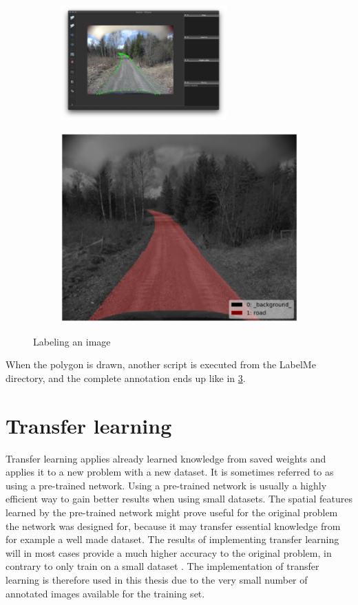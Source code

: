 \documentclass[USenglish]{ifimaster}  %
\begin{document}
\begin{figure}[ht]
\centering
\begin{subfigure}{.6\textwidth}
\includegraphics[width=0.7\textwidth]{bilder/annotating.png}
\label{fig:annotate}
\end{subfigure}
\begin{subfigure}{.6\textwidth}
\includegraphics[width=.7\linewidth]{bilder/label_viz.png}
\label{fig:finished_annotation}
\end{subfigure}
\caption{Labeling an image}
\end{figure}

When the polygon is drawn, another script is executed from the LabelMe directory, and the complete annotation ends up like in \cref{fig:finished_annotation}.  

\section{Transfer learning}
Transfer learning applies already learned knowledge from saved weights and applies it to a new problem with a new dataset. It is sometimes referred to as using a pre-trained network. Using a pre-trained network is usually a highly efficient way to gain better results when using small datasets. The spatial features learned by the pre-trained network might prove useful for the original problem the network was designed for, because it may transfer essential knowledge from for example a well made dataset. The results of implementing transfer learning will in most cases provide a much higher accuracy to the original problem, in contrary to only train on a small dataset \cite{Francois_Deep_learning_with_python}. The implementation of transfer learning is therefore used in this thesis due to the very small number of annotated images available for the training set. 
\end{document}
